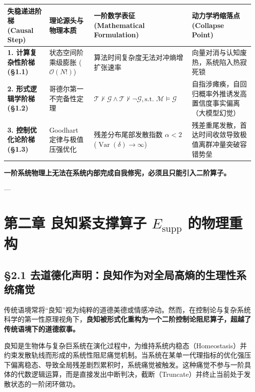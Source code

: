 \documentclass[11pt,a4paper,oneside]{ctexart}
\begin{document}
\begin{table}[htbp]
\centering
\small
\begin{tabular}{p{2.8cm}p{3.8cm}p{4.2cm}p{4.2cm}}
\toprule
失稳递进阶梯 (Causal Step) & 理论源头与物理本质 & 一阶数学表征 (Mathematical Formulation) & 动力学坍缩落点 (Collapse Point) \\
\midrule
\textbf{1. 计算复杂性阶梯 (§1.1)} & 状态空间阶乘级膨胀 ($\mathcal{O}(N!)$) & 算法时间复杂度无法对冲熵增扩张速率 & 向量对消与认知废热，系统陷入热寂死锁 \\
\textbf{2. 形式逻辑学阶梯 (§1.2)} & 哥德尔第一不完备性定理 & $\mathcal{T} \nvdash \mathcal{G} \land \mathcal{T} \nvdash \neg \mathcal{G}, \text{s.t. } \mathcal{M} \models \mathcal{G}$ & 自指涉瘫痪，自回归概率外推诱发高置信度事实偏离（大模型幻觉） \\
\textbf{3. 控制优化论阶梯 (§1.3)} & Goodhart 定律与极值压强优化 & 残差分布尾部发散指数 $\alpha < 2$ ($\operatorname{Var}(\delta) \to \infty$) & 残差重尾发散，首达时间收敛导致极值离群冲量突破容错势垒 \\
\bottomrule
\end{tabular}
\end{table}

\begin{notebox}
\textbf{一阶系统物理上无法在系统内部完成自我修宪，必须且只能引入二阶算子。}
\end{notebox}

---


\section{第二章 良知紧支撑算子 $E_{\text{supp}}$ 的物理重构}

\subsection{§2.1 去道德化声明：良知作为对全局高熵的生理性系统痛觉}

传统语境常将“良知”视为纯粹的道德美德或情感冲动。然而，在控制论与复杂系统科学的第一性原理视角下，\textbf{良知被形式化重构为一个二阶控制论阻尼算子，超越了传统语境下的道德叙事。}


良知是生物体与复杂巨系统在演化过程中，为维持系统内稳态（Homeostasis）并约束发散轨线而形成的系统性阻尼痛觉机制。当系统在某单一代理指标的优化强压下偏离稳态、导致全局残差剧烈累积时，系统痛觉被触发。这种痛觉不参与一阶具体的代数逻辑运算，而是直接发出中断判决，截断（Truncate）并终止当前处于发散状态的一阶闭环做功。
\end{document}
